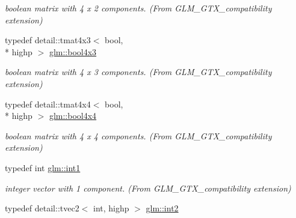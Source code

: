 \begin{DoxyCompactItemize}
\begin{DoxyCompactList}\small\item\em boolean matrix with 4 x 2 components. (From G\-L\-M\-\_\-\-G\-T\-X\-\_\-compatibility extension) \end{DoxyCompactList}\item 
\hypertarget{group__gtx__compatibility_ga7acb207ab877c53dc5751752e1f70053}{typedef detail\-::tmat4x3$<$ bool, \\*
highp $>$ \hyperlink{group__gtx__compatibility_ga7acb207ab877c53dc5751752e1f70053}{glm\-::bool4x3}}\label{group__gtx__compatibility_ga7acb207ab877c53dc5751752e1f70053}

\begin{DoxyCompactList}\small\item\em boolean matrix with 4 x 3 components. (From G\-L\-M\-\_\-\-G\-T\-X\-\_\-compatibility extension) \end{DoxyCompactList}\item 
\hypertarget{group__gtx__compatibility_ga4738dad3625bfa64ddf218897da020e9}{typedef detail\-::tmat4x4$<$ bool, \\*
highp $>$ \hyperlink{group__gtx__compatibility_ga4738dad3625bfa64ddf218897da020e9}{glm\-::bool4x4}}\label{group__gtx__compatibility_ga4738dad3625bfa64ddf218897da020e9}

\begin{DoxyCompactList}\small\item\em boolean matrix with 4 x 4 components. (From G\-L\-M\-\_\-\-G\-T\-X\-\_\-compatibility extension) \end{DoxyCompactList}\item 
\hypertarget{group__gtx__compatibility_gaba41d7803e4b24c17656d74377b88286}{typedef int \hyperlink{group__gtx__compatibility_gaba41d7803e4b24c17656d74377b88286}{glm\-::int1}}\label{group__gtx__compatibility_gaba41d7803e4b24c17656d74377b88286}

\begin{DoxyCompactList}\small\item\em integer vector with 1 component. (From G\-L\-M\-\_\-\-G\-T\-X\-\_\-compatibility extension) \end{DoxyCompactList}\item 
\hypertarget{group__gtx__compatibility_ga3f999377257cbda84c745b688ddcba81}{typedef detail\-::tvec2$<$ int, highp $>$ \hyperlink{group__gtx__compatibility_ga3f999377257cbda84c745b688ddcba81}{glm\-::int2}}\label{group__gtx__compatibility_ga3f999377257cbda84c745b688ddcba81}


\end{DoxyCompactItemize}
